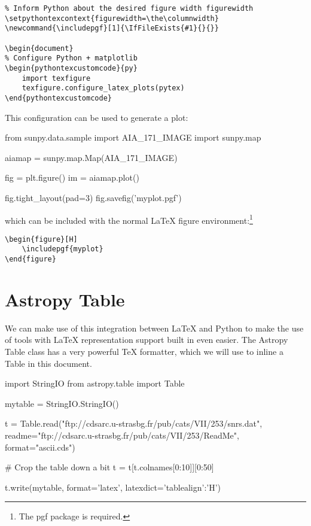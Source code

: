\documentclass[]{article}
\makeatletter
\renewenvironment{pythontexcustomcode}[2][begin]{%
	\VerbatimEnvironment
	\Depythontex{env:pythontexcustomcode:om:n}%
	\ifstrequal{#1}{begin}{}{%
		\ifstrequal{#1}{end}{}{\PackageError{\pytx@packagename}%
			{Invalid optional argument for pythontexcustomcode}{}
		}%
	}%
	\xdef\pytx@type{CC:#2:#1}%
	\edef\pytx@cmd{code}%
	\pytx@SetContext
	\def\pytx@group{none}%
	\pytx@BeginCodeEnv[none]}%
{\end{VerbatimOut}%
\setcounter{FancyVerbLine}{\value{pytx@FancyVerbLineTemp}}%
\stepcounter{\pytx@counter}%
}%
\newcommand{\includepgf}[1]{\IfFileExists{#1}{}{}}
\makeatother
\begin{document}
\begin{verbatim}
% Inform Python about the desired figure width figurewidth
\setpythontexcontext{figurewidth=\the\columnwidth}
\newcommand{\includepgf}[1]{\IfFileExists{#1}{}{}}

\begin{document}
% Configure Python + matplotlib
\begin{pythontexcustomcode}{py}
	import texfigure
	texfigure.configure_latex_plots(pytex)
\end{pythontexcustomcode}
\end{verbatim}

This configuration can be used to generate a plot:

\begin{pyblock}
from sunpy.data.sample import AIA_171_IMAGE
import sunpy.map

aiamap = sunpy.map.Map(AIA_171_IMAGE)

fig = plt.figure()
im = aiamap.plot()

fig.tight_layout(pad=3)
fig.savefig('myplot.pgf')
\end{pyblock}

which can be included with the normal LaTeX figure environment:\footnote{The pgf package is required.}

\begin{verbatim}
\begin{figure}[H]
	\includepgf{myplot}
\end{figure}
\end{verbatim}

\begin{figure}[H]
	\includepgf{myplot.pgf}
\end{figure}

\section{Astropy Table}

We can make use of this integration between LaTeX and Python to make the use of tools with LaTeX representation support built in even easier.
The Astropy Table class has a very powerful TeX formatter, which we will use to inline a Table in this document.

\begin{pyblock}
import StringIO
from astropy.table import Table

mytable = StringIO.StringIO()

t = Table.read("ftp://cdsarc.u-strasbg.fr/pub/cats/VII/253/snrs.dat",
	           readme="ftp://cdsarc.u-strasbg.fr/pub/cats/VII/253/ReadMe",
	           format="ascii.cds")

# Crop the table down a bit
t = t[t.colnames[0:10]][0:50]

t.write(mytable, format='latex', latexdict={'tablealign':'H'})

\end{pyblock}
\end{document}
